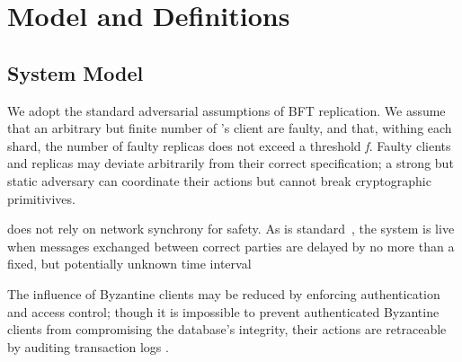 \section{Model and Definitions}


\subsection{System Model}

We adopt the standard adversarial assumptions of BFT replication. We assume that an arbitrary but finite number of \sys's client are faulty, and that, withing each shard, the number of faulty replicas does not exceed a threshold \textit{f}. Faulty clients and replicas may deviate arbitrarily from their correct specification; a strong but static adversary can coordinate their actions but cannot break  cryptographic primitivives.

\sys{} does not rely on network synchrony for safety. As is standard~\cite{castro1999practical, kotla2007zyzzyva, clement2009making, buchman2016tendermint}, the system is live when messages exchanged between correct parties are delayed by no more than a fixed, but potentially unknown time interval


The influence of Byzantine clients may be reduced by enforcing authentication and access control; though it is impossible to prevent authenticated Byzantine clients from compromising the database's integrity, their actions are  retraceable by auditing transaction logs .